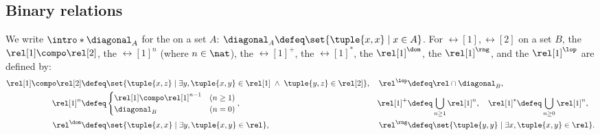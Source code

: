 \subsection{Binary relations}
\AP
We write $\intro*\diagonal_{A}$ for the \intro*{} on a set $A$: $\diagonal_{A} \defeq \set{\tuple{x, x} \mid x \in A}$.
\AP
For \intro*{} $\rel[1], \rel[2]$ on a set $B$, the \intro*{} $\rel[1] \compo \rel[2]$, the \AP
    \intro*{} $\rel[1]^{n}$ (where $n \in \nat$), the \intro*{} $\rel[1]^{+}$, the \intro*{} $\rel[1]^*$,
    the \intro*{} $\rel[1]^{\dom}$,
the \intro*{} $\rel[1]^{\rng}$, and 
the \intro*{} $\rel[1]^{\lop}$
are defined by:
\begin{align*}
    \rel[1] \compo \rel[2] & \defeq \set{\tuple{x, z} \mid \exists y, \tuple{x, y} \in \rel[1] \;\land\;  \tuple{y, z} \in \rel[2]}, &
    \rel^{\lop} &\defeq \rel \cap \diagonal_{B}, \\
    \rel[1]^n             & \defeq \begin{cases}
                                       \rel[1] \compo \rel[1]^{n-1} & (n \ge 1) \\
                                       \diagonal_{B}               & (n = 0)
                                   \end{cases}, &
    \rel[1]^{+}        & \defeq \bigcup_{n \ge 1} \rel[1]^n, \quad
    \rel[1]^*  \defeq \bigcup_{n \ge 0} \rel[1]^n,\\
    \rel^{\dom} &\defeq \set{\tuple{x, x} \mid \exists y, \tuple{x, y} \in \rel}, & 
    \rel^{\rng} &\defeq \set{\tuple{y, y} \mid \exists x, \tuple{x, y} \in \rel}. 
\end{align*}

